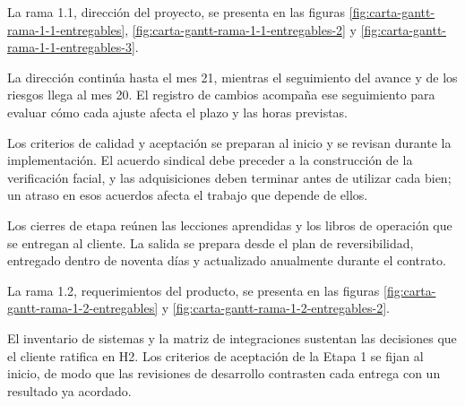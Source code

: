 \documentclass[formulario]{../../comun/overfore}
\begin{document}
\begin{horizontal}
La rama 1.1, dirección del proyecto, se presenta en las figuras \ref{fig:carta-gantt-rama-1-1-entregables}, \ref{fig:carta-gantt-rama-1-1-entregables-2} y \ref{fig:carta-gantt-rama-1-1-entregables-3}.

La dirección continúa hasta el mes 21, mientras el seguimiento del avance y de los riesgos llega al mes 20. El registro de cambios acompaña ese seguimiento para evaluar cómo cada ajuste afecta el plazo y las horas previstas.

Los criterios de calidad y aceptación se preparan al inicio y se revisan durante la implementación. El acuerdo sindical debe preceder a la construcción de la verificación facial, y las adquisiciones deben terminar antes de utilizar cada bien; un atraso en esos acuerdos afecta el trabajo que depende de ellos.

Los cierres de etapa reúnen las lecciones aprendidas y los libros de operación que se entregan al cliente. La salida se prepara desde el plan de reversibilidad, entregado dentro de noventa días y actualizado anualmente durante el contrato.

La rama 1.2, requerimientos del producto, se presenta en las figuras \ref{fig:carta-gantt-rama-1-2-entregables} y \ref{fig:carta-gantt-rama-1-2-entregables-2}.

El inventario de sistemas y la matriz de integraciones sustentan las decisiones que el cliente ratifica en H2. Los criterios de aceptación de la Etapa 1 se fijan al inicio, de modo que las revisiones de desarrollo contrasten cada entrega con un resultado ya acordado.


\end{horizontal}
\end{document}
